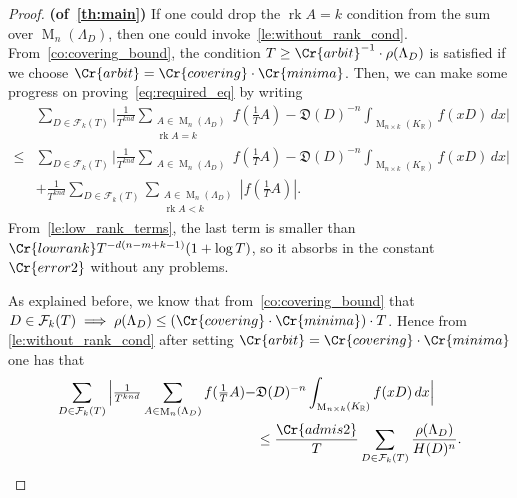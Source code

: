 \documentclass{amsart}
\theoremstyle{definition}
\theoremstyle{remark}
\newcommand{\KR}{K_\mathbb{R}}
\DeclareMathOperator{\M}{M}
\DeclareMathOperator{\rank}{rk}
\begin{document}
\begin{proof} {\bf (of~\cref{th:main})}
    If one could drop the $\rank A= k$ condition from the sum over $\M_{n}(\Lambda_{D})$, then one could invoke~\cref{le:without_rank_cond}. 
    From~\cref{co:covering_bound}, the condition $T  \geq \Cr{arbit}^{-1}  \cdot \rho(\Lambda_{D})$ is satisfied 
    if we choose $\Cr{arbit} = \Cr{covering}\cdot \Cr{minima}$.
    Then, we can make some progress on proving~\cref{eq:required_eq} by writing
    \begin{align}
  & 
  \sum_{D \in \mathcal{F}_{k}(T)}^{}  \Big|
  \tfrac{1}{T^{knd}}\sum_{\substack{A \in \M_{n}(\Lambda_{D}) \\ \rank A = k}} f( \tfrac{1}{T} A)  - 
  \mathfrak{D}(D)^{-n}\int_{\M_{n \times k}(\KR)} f( x D )\, dx \Big|  \\
        \leq & 
        \sum_{D \in \mathcal{F}_{k}(T)}^{}  \Big|
        \tfrac{1}{T^{knd}}\sum_{\substack{A \in \M_{n}(\Lambda_{D}) }} f( \tfrac{1}{T} A)  - 
        \mathfrak{D}(D)^{-n}\int_{\M_{n \times k}(\KR)} f( x D )\, dx \Big|  \\
             & + \tfrac{1}{T^{knd}}\sum_{D \in \mathcal{F}_{k}(T)}  \sum_{\substack{A \in \M_{n}(\Lambda_{D}) \\ \rank A < k}}^{} | f(\tfrac{1}{T} A ) |.
    \end{align}
    From~\cref{le:low_rank_terms}, the last term is smaller than $\Cr{lowrank}T^{-d(n-m+k-1)}(1+ \log T)$, so it absorbs in the constant $\Cr{error2}$ without any problems.

    As explained before, we know that from~\cref{co:covering_bound} that
    $D \in \mathcal{F}_{k}(T) \implies  \rho(\Lambda_{D}) \leq (\Cr{covering} \cdot \Cr{minima} )\cdot T$. Hence from \cref{le:without_rank_cond} 
    after setting $\Cr{arbit} = \Cr{covering}\cdot \Cr{minima}$
    one has that 
    \begin{align}
        \sum_{D \in \mathcal{F}_{k}(T)}
        \Big|
        \tfrac{1}{T^{knd}}\sum_{\substack{A \in \M_{n}(\Lambda_{D}) }} f( \tfrac{1}{T} A)  -  
    & \mathfrak{D}(D)^{-n}\int_{\M_{n \times k}(\KR)} f( x D )\, dx \Big|   \\ 
    & \leq  \frac{\Cr{admis2}}{T}\sum_{D \in \mathcal{F}_{k}(T)}^{} 
    \frac{ \rho(\Lambda_{D})}{H(D)^{n}}.
    \label{eq:ineq212}
    \end{align}


    


\end{proof}
\end{document}

